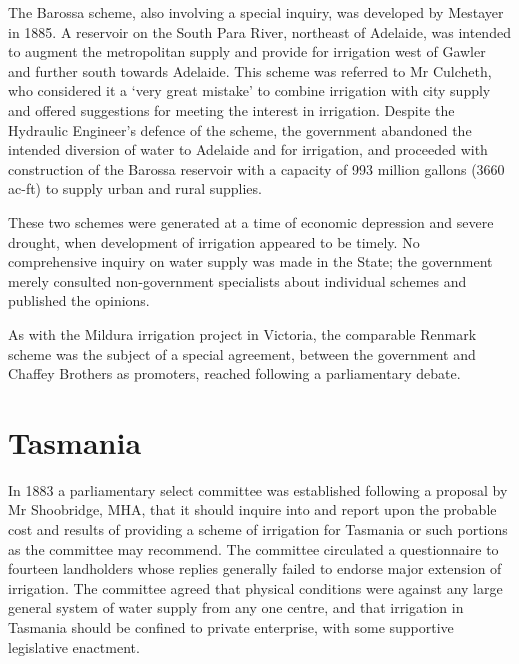 The Barossa scheme, also involving a special inquiry, was developed by
Mestayer in 1885.  A reservoir on the
South Para River, northeast of Adelaide, was intended to augment the
metropolitan supply and provide for irrigation west of Gawler and
further south towards Adelaide.  This scheme was referred to Mr
Culcheth, who considered it a `very great mistake' to combine
irrigation with city supply and offered suggestions for meeting the
interest in irrigation.  Despite the
Hydraulic Engineer's defence of the scheme, the government abandoned
the intended diversion of water to Adelaide and for irrigation, and
proceeded with construction of the Barossa reservoir with a capacity
of 993 million gallons (3660\,ac-ft) to supply urban and rural
supplies.

These two schemes were generated at a time of economic depression and
severe drought, when development of irrigation appeared to be
timely. No comprehensive inquiry on water supply was made in the
State; the government merely consulted non-government specialists
about individual schemes and published the opinions.

As with the Mildura irrigation project in Victoria, the comparable
Renmark scheme was the subject of a special agreement, between the
government and Chaffey Brothers as promoters, reached following a
parliamentary debate.

\section*{Tasmania}

In 1883 a parliamentary select committee was established following a
proposal by Mr Shoobridge, MHA, that it should inquire into and report
upon the probable cost and results of providing a scheme of irrigation
for Tasmania or such portions as the committee may recommend.  The
committee circulated a questionnaire to fourteen landholders whose
replies generally failed to endorse major extension of irrigation.
The committee agreed that physical conditions were against any large
general system of water supply from any one centre, and that
irrigation in Tasmania should be confined to private enterprise, with
some supportive legislative enactment.

